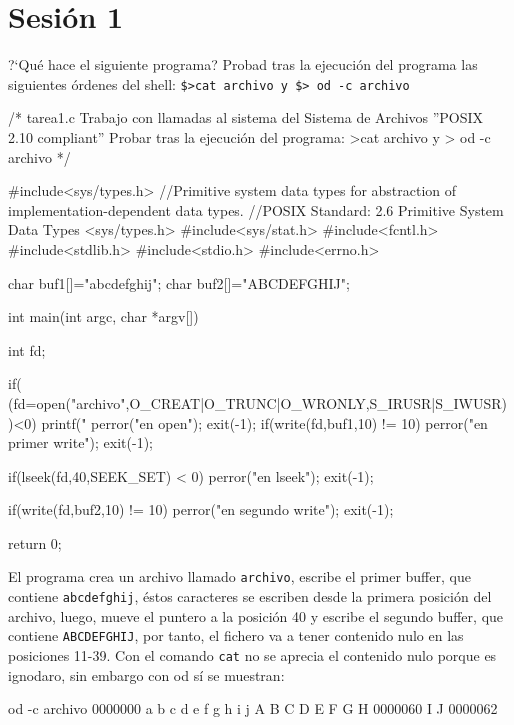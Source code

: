 \chapter{Sesión 1}

\begin{exercise}
?`Qué hace el siguiente programa? Probad tras la ejecución del programa las
siguientes órdenes del shell: \verb!$>cat archivo y $> od -c archivo!
\begin{cppcode}
/*
tarea1.c
Trabajo con llamadas al sistema del Sistema de Archivos ''POSIX 2.10 compliant''
Probar tras la ejecución del programa: >cat archivo y > od -c archivo
*/

#include<sys/types.h>   //Primitive system data types for abstraction of implementation-dependent data types.
                        //POSIX Standard: 2.6 Primitive System Data Types <sys/types.h>
#include<sys/stat.h>
#include<fcntl.h>
#include<stdlib.h>
#include<stdio.h>
#include<errno.h>

char buf1[]="abcdefghij";
char buf2[]="ABCDEFGHIJ";

int main(int argc, char *argv[])
{
int fd;

if( (fd=open("archivo",O_CREAT|O_TRUNC|O_WRONLY,S_IRUSR|S_IWUSR))<0) {
    printf("\nError %
    perror("\nError en open");
    exit(-1);
}
if(write(fd,buf1,10) != 10) {
    perror("\nError en primer write");
    exit(-1);
}

if(lseek(fd,40,SEEK_SET) < 0) {
    perror("\nError en lseek");
    exit(-1);
}

if(write(fd,buf2,10) != 10) {
    perror("\nError en segundo write");
    exit(-1);
}

return 0;
}
\end{cppcode}

{\color{blue} El programa crea un archivo llamado \verb!archivo!, escribe el primer buffer, que contiene \verb!abcdefghij!, éstos caracteres se escriben desde la primera posición del archivo, luego, mueve el puntero a la posición 40 y escribe el segundo buffer, que contiene \verb!ABCDEFGHIJ!, por tanto, el fichero va a tener contenido nulo en las posiciones 11-39. Con el comando \verb!cat! no se aprecia el contenido nulo porque es ignodaro, sin embargo con od sí se muestran:}

\begin{bashcode}
 od -c archivo 
0000000   a   b   c   d   e   f   g   h   i   j  \0  \0  \0  \0  \0    \0  \0  \0  \0  \0  \0  \0  \0  \0  \0  \0  \0  \0  \0  \0    \0  \0  \0  \0  \0  \0  \0  \0   A   B   C   D   E   F   G   H
0000060   I   J
0000062
\end{bashcode}

\end{exercise}

